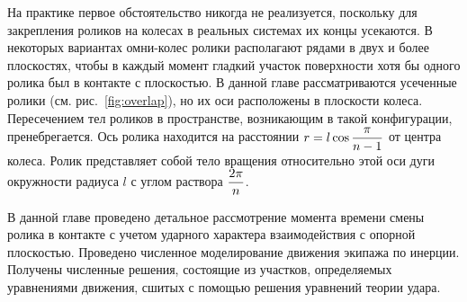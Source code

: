 На практике первое обстоятельство никогда не реализуется, поскольку для закрепления роликов на колесах в реальных системах их концы усекаются. В некоторых вариантах омни-колес ролики располагают рядами в двух и более плоскостях, чтобы в каждый момент гладкий участок поверхности хотя бы одного ролика был в контакте с плоскостью. В данной главе рассматриваются усеченные ролики (см. рис.~\ref{fig:overlap}), но их оси расположены в плоскости колеса. Пересечением тел роликов в пространстве, возникающим в такой конфигурации, пренебрегается. Ось ролика находится на расстоянии $r = l\cos\displaystyle\frac{\displaystyle \pi}{\displaystyle n-1}$ от центра колеса. Ролик представляет собой тело вращения относительно этой оси дуги окружности радиуса $l$ с углом раствора $\displaystyle\frac{\displaystyle 2\pi}{\displaystyle n}$.

В данной главе проведено детальное рассмотрение момента времени смены ролика в контакте с учетом ударного характера взаимодействия с опорной плоскостью. Проведено численное моделирование движения экипажа по инерции. Получены численные решения, состоящие из участков, определяемых уравнениями движения, сшитых с помощью решения уравнений теории удара.
